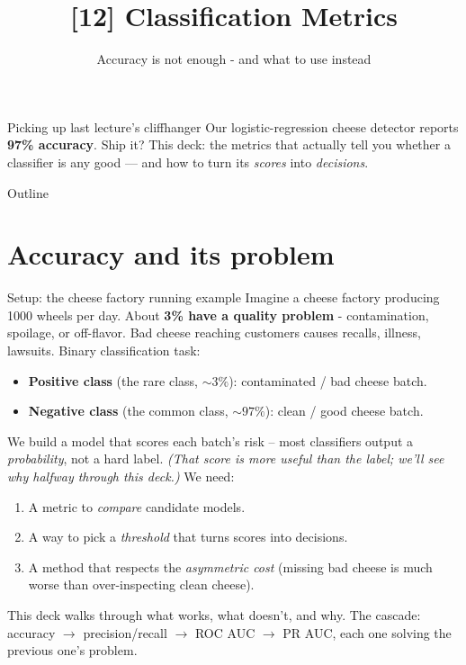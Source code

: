 \documentclass[aspectratio=169]{beamer}
\title{[12] Classification Metrics}
\subtitle{Accuracy is not enough - and what to use instead}
\date{}
\begin{document}
\begin{frame}{Picking up last lecture's cliffhanger}
  Our logistic-regression cheese detector reports \textbf{97\% accuracy}. Ship it?
  \vfill
  \vfill
  This deck: the metrics that actually tell you whether a classifier is any good --- and
  how to turn its \emph{scores} into \emph{decisions}.
\end{frame}

\begin{frame}{Outline}
  \tableofcontents
\end{frame}

\section{Accuracy and its problem}

\begin{frame}{Setup: the cheese factory running example}
  Imagine a cheese factory producing 1000 wheels per day. About \textbf{3\% have a quality problem} - contamination, spoilage, or off-flavor. Bad cheese reaching customers causes recalls, illness, lawsuits.
  \vfill
  Binary classification task:
  \begin{itemize}
    \item \textbf{Positive class} (the rare class, $\sim 3\%$): contaminated / bad cheese batch.
    \item \textbf{Negative class} (the common class, $\sim 97\%$): clean / good cheese batch.
  \end{itemize}
  \vfill
  We build a model that scores each batch's risk -- most classifiers output a \emph{probability}, not a hard label. \emph{(That score is more useful than the label; we'll see why halfway through this deck.)} We need:
  \begin{enumerate}\small
    \item A metric to \emph{compare} candidate models.
    \item A way to pick a \emph{threshold} that turns scores into decisions.
    \item A method that respects the \emph{asymmetric cost} (missing bad cheese is much worse than over-inspecting clean cheese).
  \end{enumerate}
  \vfill
  This deck walks through what works, what doesn't, and why. The cascade: accuracy $\to$ precision/recall $\to$ ROC AUC $\to$ PR AUC, each one solving the previous one's problem.
\end{frame}
\end{document}
